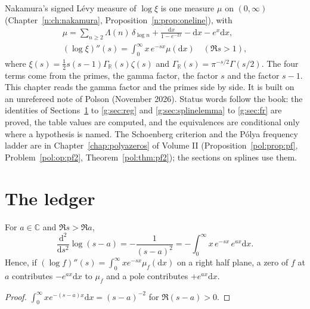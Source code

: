 \label{g:ch:gammaprimes}

Nakamura's signed L\'evy measure of $\log\xi$ is one measure $\mu$ on $(0,\infty)$ (Chapter~\ref{n:ch:nakamura}, Proposition~\ref{n:prop:oneline}), with
\begin{gather*}
\mu=\sum_{n\ge2}\Lambda(n)\,\delta_{\log n}+\frac{\mathrm dx}{1-e^{-2x}}-\mathrm dx-e^x\mathrm dx,\\
(\log\xi)''(s)=\int_0^\infty x\,e^{-sx}\mu(\mathrm dx)\quad(\Re s>1),
\end{gather*}
where $\xi(s)=\frac12s(s-1)\Gamma_{\mathbb R}(s)\zeta(s)$ and $\Gamma_{\mathbb R}(s)=\pi^{-s/2}\Gamma(s/2)$. The four terms come from the primes, the gamma factor, the factor $s$ and the factor $s-1$. This chapter reads the gamma factor and the primes side by side. It is built on an unrefereed note of Polson (November 2026). Status words follow the book: the identities of Sections~\ref{g:sec:ledger} to \ref{g:sec:reg} and \ref{g:sec:splinelemma} to \ref{g:sec:fr} are proved, the table values are computed, and the equivalences are conditional only where a hypothesis is named. The Schoenberg criterion and the Pólya frequency ladder are in Chapter~\ref{chap:polyazeros} of Volume II (Proposition~\ref{pol:prop:pf}, Problem~\ref{pol:op:pf2}, Theorem~\ref{pol:thm:pf2}); the sections on splines use them.

\section{The ledger}\label{g:sec:ledger}

\begin{lemma}\label{g:lem:ledger}
For $a\in\mathbb C$ and $\Re s>\Re a$,
\[
\frac{\mathrm d^2}{\mathrm ds^2}\log(s-a)=-\frac{1}{(s-a)^2}=-\int_0^\infty x\,e^{-sx}\,e^{ax}\mathrm dx .
\]
Hence, if $(\log f)''(s)=\int_0^\infty xe^{-sx}\mu_f(\mathrm dx)$ on a right half plane, a zero of $f$ at $a$ contributes $-e^{ax}\mathrm dx$ to $\mu_f$ and a pole contributes $+e^{ax}\mathrm dx$.
\end{lemma}

\begin{proof}
$\int_0^\infty xe^{-(s-a)x}\mathrm dx=(s-a)^{-2}$ for $\Re(s-a)>0$.
\end{proof}

